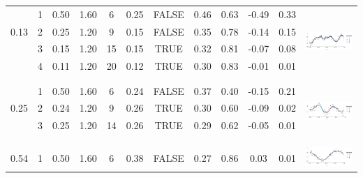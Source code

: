 \begin{table}
\begin{tabular}{ c c c c c c c c c c | c c}
\multirow{3}{*}{ 0.13} 
 & 1 & 0.50 & 1.60 & 6 & 0.25 & FALSE & 0.46 & 0.63 & -0.49 & 0.33 & \multirow{5}{*}{ \includegraphics[scale=0.20, trim = 0mm 10mm 0mm 5mm, clip]{fig9_diagnostic_3.png}}\\
 & 2 & 0.25 & 1.20 & 9 & 0.15 & FALSE & 0.35 & 0.78 & -0.14 & 0.15 & \\
 & 3 & 0.15 & 1.20 & 15 & 0.15 & TRUE & 0.32 & 0.81 & -0.07 & 0.08 & \\
 & 4 & 0.11 & 1.20 & 20 & 0.12 & TRUE & 0.30 & 0.83 & -0.01 & 0.01 & \\
 \\[1mm]
\arrayrulecolor{lightgray}\hline \\[-1mm]
\multirow{3}{*}{ 0.25} 
 & 1 & 0.50 & 1.60 & 6 & 0.24 & FALSE & 0.37 & 0.40 & -0.15 & 0.21 & \multirow{5}{*}{ \includegraphics[scale=0.20, trim = 0mm 10mm 0mm 5mm, clip]{fig9_diagnostic_4.png}}\\
 & 2 & 0.24 & 1.20 & 9 & 0.26 & TRUE & 0.30 & 0.60 & -0.09 & 0.02 & \\
 & 3 & 0.25 & 1.20 & 14 & 0.26 & TRUE & 0.29 & 0.62 & -0.05 & 0.01 & \\
 \\
 \\[1mm]
\arrayrulecolor{lightgray}\hline \\[-1mm]
\multirow{3}{*}{ 0.54} 
 & 1 & 0.50 & 1.60 & 6 & 0.38 & FALSE & 0.27 & 0.86 & 0.03 & 0.01 & \multirow{5}{*}{ \includegraphics[scale=0.20, trim = 0mm 10mm 0mm 3mm, clip]{fig9_diagnostic_5.png}}\\

\end{tabular}
\end{table}
